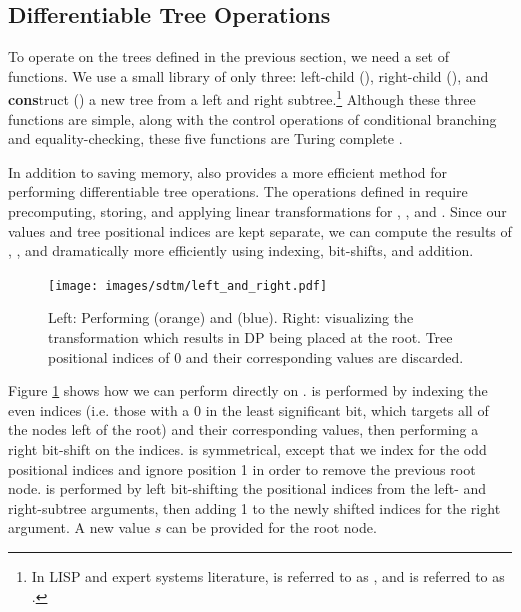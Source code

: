 \subsection{Differentiable Tree Operations} \label{sec:sdtm-diff-tree-ops}

To operate on the trees defined in the previous section, we need a set of functions. We use a small library of only three: left-child (\leftcommand), right-child (\rightcommand), and \textbf{cons}truct (\cons) a new tree from a left and right subtree.\footnote{In LISP and expert systems literature, \leftcommand is referred to as \car, and \rightcommand is referred to as \cdr.} Although these three functions are simple, along with the control operations of conditional branching and equality-checking, these five functions are Turing complete \citep{mccarthy1960recursive}.

In addition to saving memory, \abvrepname also provides a more efficient method for performing differentiable tree operations. The operations defined in \citet{pmlr-v202-soulos23a} require precomputing, storing, and applying linear transformations for \leftcommand, \rightcommand, and \cons. Since our values and tree positional indices are kept separate, we can compute the results of \leftcommand, \rightcommand, and \cons dramatically more efficiently using indexing, bit-shifts, and addition.

\begin{figure}
    \centering
    \texttt{[image: images/sdtm/left\_and\_right.pdf]}
    \caption{Left: Performing \leftcommand (orange) and \rightcommand (blue). Right: visualizing the \leftcommand transformation which results in DP being placed at the root. Tree positional indices of $0$ and their corresponding values are discarded.}
    \label{fig:sparse-operations}
\end{figure}

Figure \ref{fig:sparse-operations} shows how we can perform \leftcommand directly on \abvrepname. \leftcommand is performed by indexing the even indices (i.e. those with a 0 in the least significant bit, which targets all of the nodes left of the root) and their corresponding values, then performing a right bit-shift on the indices. \rightcommand is symmetrical, except that we index for the odd positional indices and ignore position 1 in order to remove the previous root node. \cons is performed by left bit-shifting the positional indices from the left- and right-subtree arguments, then adding 1 to the newly shifted indices for the right argument. A new value $s$ can be provided for the root node.


